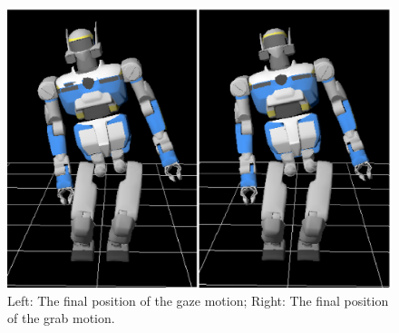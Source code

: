 \documentclass[letterpaper, 10pt, conference]{ieeeconf}      %
\begin{document}
\begin{figure}[t]
\begin{center}
\includegraphics[width=0.7\linewidth]{img/spotDiff3.ps}
\end{center}
\caption{Left: The final position of the gaze motion; Right: The final position of the grab motion.}
\label{fig:spotDiff3}
\end{figure}
\end{document}
